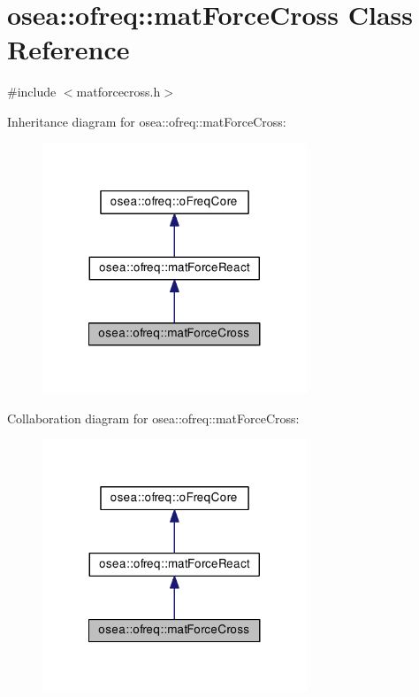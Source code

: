 \hypertarget{classosea_1_1ofreq_1_1mat_force_cross}{\section{osea\-:\-:ofreq\-:\-:mat\-Force\-Cross Class Reference}
\label{classosea_1_1ofreq_1_1mat_force_cross}
}


{\ttfamily \#include $<$matforcecross.\-h$>$}



Inheritance diagram for osea\-:\-:ofreq\-:\-:mat\-Force\-Cross\-:\nopagebreak
\begin{figure}[H]
\begin{center}
\leavevmode
\includegraphics[width=224pt]{classosea_1_1ofreq_1_1mat_force_cross__inherit__graph}
\end{center}
\end{figure}


Collaboration diagram for osea\-:\-:ofreq\-:\-:mat\-Force\-Cross\-:\nopagebreak
\begin{figure}[H]
\begin{center}
\leavevmode
\includegraphics[width=224pt]{classosea_1_1ofreq_1_1mat_force_cross__coll__graph}
\end{center}
\end{figure}
